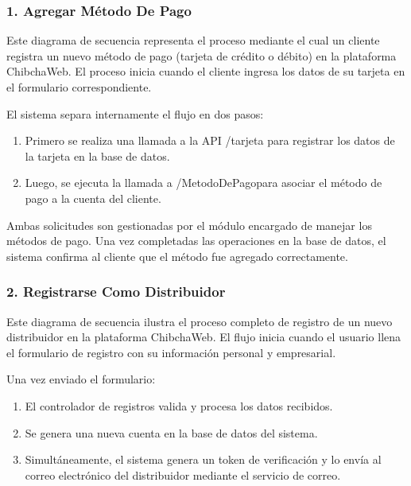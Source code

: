 \subsubsection*{1. Agregar Método De Pago}

Este diagrama de secuencia representa el proceso mediante el cual un cliente registra un nuevo método de pago (tarjeta de crédito o débito) en la plataforma ChibchaWeb. El proceso inicia cuando el cliente ingresa los datos de su tarjeta en el formulario correspondiente.

El sistema separa internamente el flujo en dos pasos:

\begin{enumerate}
    \item Primero se realiza una llamada a la API /tarjeta para registrar los datos de la tarjeta en la base de datos.
    \item Luego, se ejecuta la llamada a /MetodoDePagopara asociar el método de pago a la cuenta del cliente.
\end{enumerate}

Ambas solicitudes son gestionadas por el módulo encargado de manejar los métodos de pago. Una vez completadas las operaciones en la base de datos, el sistema confirma al cliente que el método fue agregado correctamente.

\subsubsection*{2.  Registrarse Como Distribuidor}

Este diagrama de secuencia ilustra el proceso completo de registro de un nuevo distribuidor en la plataforma ChibchaWeb. El flujo inicia cuando el usuario llena el formulario de registro con su información personal y empresarial.

Una vez enviado el formulario:

\begin{enumerate}
\item El controlador de registros valida y procesa los datos recibidos.

\item Se genera una nueva cuenta en la base de datos del sistema.

\item Simultáneamente, el sistema genera un token de verificación y lo envía al correo electrónico del distribuidor mediante el servicio de correo.
\end{enumerate}

